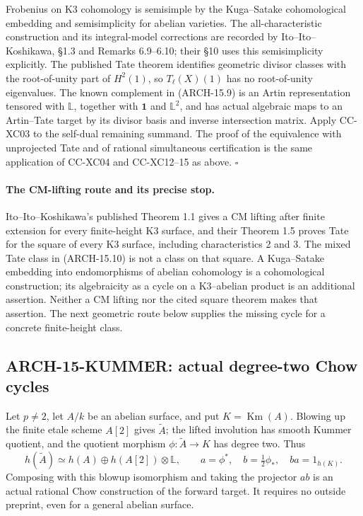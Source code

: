 Frobenius on K3 cohomology is semisimple by the Kuga--Satake
cohomological embedding and semisimplicity for abelian varieties. The
all-characteristic construction and its integral-model corrections are
recorded by Ito--Ito--Koshikawa, \S1.3 and Remarks 6.9--6.10; their
\S10 uses this semisimplicity explicitly. The published Tate theorem
identifies geometric divisor classes with the root-of-unity part of
\(H^2(1)\), so \(T_\ell(X)(1)\) has no root-of-unity eigenvalues. The
known complement in (ARCH-15.9) is an Artin representation tensored
with \(\mathbb L\), together with \(\mathbf1\) and \(\mathbb L^2\),
and has actual algebraic maps to an Artin--Tate target by its divisor
basis and inverse intersection matrix. Apply CC-XC03 to the self-dual
remaining summand. The proof of the equivalence with unprojected Tate
and of rational simultaneous certification is the same application of
CC-XC04 and CC-XC12--15 as above. \(\square\)

\paragraph{The CM-lifting route and its precise stop.}
Ito--Ito--Koshikawa's published Theorem 1.1 gives a CM lifting after
finite extension for every finite-height K3 surface, and their Theorem
1.5 proves Tate for the square of every K3 surface, including
characteristics 2 and 3. The mixed Tate class in (ARCH-15.10) is not a
class on that square. A Kuga--Satake embedding into endomorphisms of
abelian cohomology is a cohomological construction; its algebraicity as
a cycle on a K3--abelian product is an additional assertion. Neither a
CM lifting nor the cited square theorem makes that assertion. The next
geometric route below supplies the missing cycle for a concrete
finite-height class.

\subsection{ARCH-15-KUMMER: actual degree-two Chow cycles}

Let \(p\ne2\), let \(A/k\) be an abelian surface, and put
\(K=\operatorname{Km}(A)\). Blowing up the finite etale scheme
\(A[2]\) gives \(\widetilde A\); the lifted involution has smooth Kummer
quotient, and the quotient morphism \(\phi:\widetilde A\to K\) has
degree two. Thus
\[
 h(\widetilde A)\simeq h(A)\oplus h(A[2])\otimes\mathbb L,
 \qquad
 a=\phi^*,\quad b=\tfrac12\phi_*,\quad ba=1_{h(K)}.
 \tag{ARCH-15.11}
\]
Composing with this blowup isomorphism and taking the projector \(ab\)
is an actual rational Chow construction of the forward target. It
requires no outside preprint, even for a general abelian surface.

